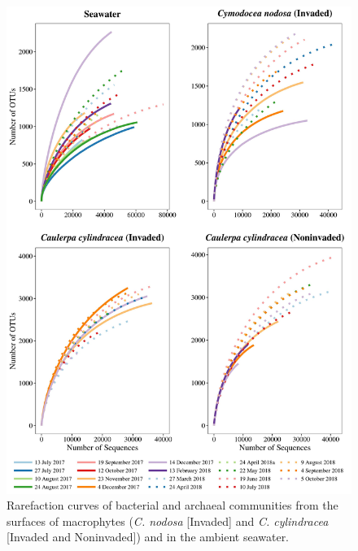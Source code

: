 \documentclass[12pt,]{article}
\begin{document}
\begin{figure}[H]

{\centering \includegraphics[width=0.85\linewidth]{../results/figures/rarefaction} 

}

\caption{Rarefaction curves of bacterial and archaeal communities from the surfaces of macrophytes (\textit{C. nodosa} [Invaded] and \textit{C. cylindracea} [Invaded and Noninvaded]) and in the ambient seawater.\label{rarefaction}}\label{fig:unnamed-chunk-1}
\end{figure}
\end{document}
